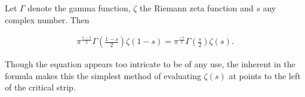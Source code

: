 \documentclass[12pt]{article}
\newcommand{\<}{\langle}
\renewcommand{\>}{\rangle}
\begin{document}
Let $\Gamma$ denote the gamma function, $\zeta$ the Riemann zeta function and $s$ any complex number.  Then

\begin{align*}
\pi^\frac{s-1}{2}\Gamma\left(\frac{1-s}{2}\right)\zeta(1-s)=\pi^{\frac{-s}{2}}\Gamma\left(\frac{s}{2}\right)\zeta(s).
\end{align*}

Though the equation appears too intricate to be of any use, the inherent  in the formula makes this the simplest method of evaluating $\zeta(s)$ at points to the left of the critical strip.
\end{document}
